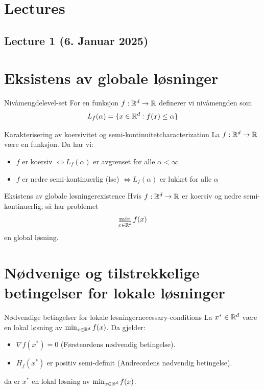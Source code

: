 \section{Lectures}

\subsection{Lecture 1 (6. Januar 2025)}

\section*{Eksistens av globale løsninger}

\begin{definition}{Nivåmengde}{level-set}
  For en funksjon  \(f: \mathbb{R}^d \to \mathbb{R}\) definerer vi nivåmengden som
  \[
    L_f(\alpha) = \{x \in \mathbb{R}^d : f(x) \leq \alpha\}
  \]
\end{definition}

\begin{theorem}{Karakterisering av koersivitet og semi-kontinuitet}{characterization}
  La  \(f: \mathbb{R}^d \to \mathbb{R}\) være en funksjon. Da har vi:
  \begin{itemize}
    \item  \(f\) er koersiv  \(\iff L_f(\alpha)\) er avgrenset for alle  \(\alpha < \infty\)
    \item  \(f\) er nedre semi-kontinuerlig (lsc)  \(\iff L_f(\alpha)\) er lukket for alle  \(\alpha\)
  \end{itemize}
\end{theorem}

\begin{theorem}{Eksistens av globale løsninger}{existence}
  Hvis  \(f: \mathbb{R}^d \to \mathbb{R}\) er koersiv og nedre semi-kontinuerlig, så har problemet
  \[
    \min_{x \in \mathbb{R}^d} f(x)
  \]
  en global løsning.
\end{theorem}

\section*{Nødvenige og tilstrekkelige betingelser for lokale løsninger}

\begin{theorem}{Nødvendige betingelser for lokale løsninger}{necessary-conditions}
  La  \(x^* \in \mathbb{R}^d\) være en lokal løsning av  \(\min_{x \in \mathbb{R}^d} f(x)\). Da gjelder:
  \begin{itemize}
    \item  \(\nabla f(x^*) = 0\) (Førsteordens nødvendig betingelse).
    \item  \(H_f(x^*)\) er positiv semi-definit (Andreordens nødvendig betingelse).
  \end{itemize}
  da er \(x^*\) en lokal løsning av  \(\min_{x \in \mathbb{R}^d} f(x)\).
\end{theorem}

